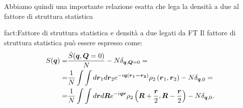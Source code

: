 Abbiamo quindi una importante relazione esatta che lega la densità a due al fattore di struttura statistica
\begin{fact}{fact:Fattore di struttura statistica e densità a due legati da FT}
	Il fattore di struttura statistica può essere espresso come:
	\[\begin{aligned}
		S(\boldsymbol{q}) 
		=&
		\frac{\hat{S}(\boldsymbol{q},\boldsymbol{Q}=0)}{N} - N \delta_{\boldsymbol{q},\boldsymbol{Q}=0} =\\
		=&
		\frac{1}{N}\int\int d \boldsymbol{r}_1 d \boldsymbol{r}_2e^{-i \boldsymbol{q} \left( \boldsymbol{\boldsymbol{r}_1 - \boldsymbol{r}_2} \right) }\rho _2 \left( \boldsymbol{r}_1,\boldsymbol{r}_2 \right) - N \delta_{\boldsymbol{q},0}=\\
		=&
		\frac{1}{N}\int\int d \boldsymbol{r} d \boldsymbol{R}e^{-i \boldsymbol{q}\boldsymbol{r}}\rho _2 \left( \boldsymbol{R} + \frac{\boldsymbol{r}}{2}, \boldsymbol{R}- \frac{\boldsymbol{r}}{2} \right) - N \delta_{\boldsymbol{q},0}
	.\end{aligned}\]
\end{fact}
